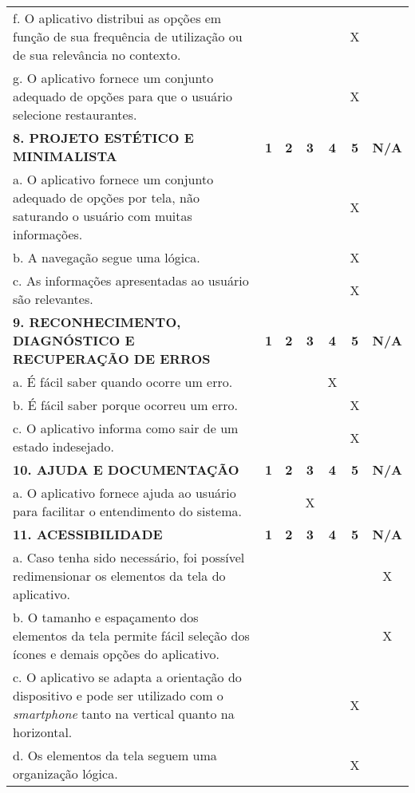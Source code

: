 \documentclass[portuguese,oneside]{tcc}
\begin{document}
\begin{center}
\begin{longtabu}{|L{25em}|c|c|c|c|c|c|}
	f. O aplicativo distribui as opções em função de sua frequência de utilização ou de sua relevância no contexto.	& & & & & X & \\ 
	g. O aplicativo fornece um conjunto adequado de opções para que o usuário selecione restaurantes. & & & & & X & \\ 
	\textbf{8. PROJETO ESTÉTICO E MINIMALISTA} & \textbf{1} & \textbf{2} & \textbf{3} & \textbf{4} & \textbf{5} & \textbf{N/A} \\ 
	a. O aplicativo fornece um conjunto adequado de opções por tela, não saturando o usuário com muitas informações. & & & & & X & \\ 
	b. A navegação segue uma lógica. & & & & & X & \\ 
	c. As informações apresentadas ao usuário são relevantes. & & & & & X & \\ 
	\textbf{9. RECONHECIMENTO, DIAGNÓSTICO E RECUPERAÇÃO DE ERROS} & \textbf{1} & \textbf{2} & \textbf{3} & \textbf{4} & \textbf{5} & \textbf{N/A} \\ 
	a. É fácil saber quando ocorre um erro.	& & & & X & & \\ 
	b. É fácil saber porque ocorreu um erro. & & & & & X & \\ 
	c. O aplicativo informa como sair de um estado indesejado. & & & & & X & \\ 
	\textbf{10. AJUDA E DOCUMENTAÇÃO} & \textbf{1} & \textbf{2} & \textbf{3} & \textbf{4} & \textbf{5} & \textbf{N/A} \\ 
	a. O aplicativo fornece ajuda ao usuário para facilitar o entendimento do sistema. & & & X & & & \\ 
	\textbf{11. ACESSIBILIDADE} & \textbf{1} & \textbf{2} & \textbf{3} & \textbf{4} & \textbf{5} & \textbf{N/A} \\ 
	a. Caso tenha sido necessário, foi possível redimensionar os elementos da tela do aplicativo. & & & & & & X \\ 
	b. O tamanho e espaçamento dos elementos da tela permite fácil seleção dos ícones e demais opções do aplicativo. & & & & & & X \\ 
	c. O aplicativo se adapta a orientação do dispositivo e pode ser utilizado com o \emph{smartphone} tanto na vertical quanto na horizontal. & & & & & X & \\ 
	d. Os elementos da tela seguem uma organização lógica. & & & & & X & \\ 

\end{longtabu}
\end{center}
\end{document}
